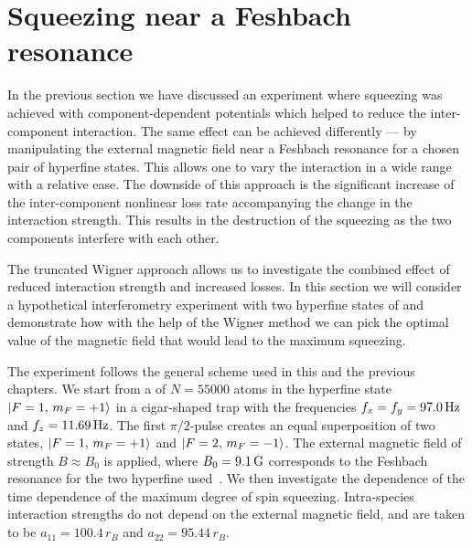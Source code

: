 \section{Squeezing near a Feshbach resonance}

In the previous section we have discussed an experiment where squeezing was achieved with component-dependent potentials which helped to reduce the inter-component interaction.
The same effect can be achieved differently --- by manipulating the external magnetic field near a Feshbach resonance for a chosen pair of hyperfine states.
This allows one to vary the interaction in a wide range with a relative ease.
The downside of this approach is the significant increase of the inter-component nonlinear loss rate accompanying the change in the interaction strength.
This results in the destruction of the squeezing as the two components interfere with each other.

The truncated Wigner approach allows us to investigate the combined effect of reduced interaction strength and increased losses.
In this section we will consider a hypothetical interferometry experiment with two hyperfine states of \Rb{} and demonstrate how with the help of the Wigner method we can pick the optimal value of the magnetic field that would lead to the maximum squeezing.

The experiment follows the general scheme used in this and the previous chapters.
We start from a  of $N = 55000$ \Rb{} atoms in the hyperfine state ${\mbox{\ensuremath{\vert F=1,\, m_F=+1 \rangle}}}$ in a cigar-shaped trap with the frequencies $f_x = f_y = 97.0\mbox{\ensuremath{\,\mathrm{Hz}}}$ and $f_z = 11.69\mbox{\ensuremath{\,\mathrm{Hz}}}$.
The first $\pi/2$-pulse creates an equal superposition of two states, ${\mbox{\ensuremath{\vert F=1,\, m_F=+1 \rangle}}}$ and ${\mbox{\ensuremath{\vert F=2,\, m_F=-1 \rangle}}}$.
The external magnetic field of strength $B \approx B_0$ is applied, where $B_0 = 9.1\mbox{\ensuremath{\,\mathrm{G}}}$ corresponds to the Feshbach resonance for the two hyperfine used~\cite{Kaufman2009}.
We then investigate the dependence of the time dependence of the maximum degree of spin squeezing.
Intra-species interaction strengths do not depend on the external magnetic field, and are taken to be $a_{11} = 100.4\,r_B$ and $a_{22} = 95.44\,r_B$.

